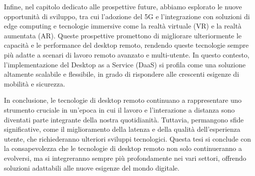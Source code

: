 \documentclass[12pt,a4paper,openright,twoside]{book}
\begin{document}
Infine, nel capitolo dedicato alle prospettive future, abbiamo esplorato le nuove opportunità di sviluppo, tra cui l'adozione del 5G e l'integrazione con soluzioni di edge computing e tecnologie immersive come la realtà virtuale (VR) e la realtà aumentata (AR). Queste prospettive promettono di migliorare ulteriormente le capacità e le performance del desktop remoto, rendendo queste tecnologie sempre più adatte a scenari di lavoro remoto avanzato e multi-utente. In questo contesto, l'implementazione del Desktop as a Service (DaaS) si profila come una soluzione altamente scalabile e flessibile, in grado di rispondere alle crescenti esigenze di mobilità e sicurezza.

In conclusione, le tecnologie di desktop remoto continuano a rappresentare uno strumento cruciale in un'epoca in cui il lavoro e l'interazione a distanza sono diventati parte integrante della nostra quotidianità. Tuttavia, permangono sfide significative, come il miglioramento della latenza e della qualità dell’esperienza utente, che richiederanno ulteriori sviluppi tecnologici. Questa tesi si conclude con la consapevolezza che le tecnologie di desktop remoto non solo continueranno a evolversi, ma si integreranno sempre più profondamente nei vari settori, offrendo soluzioni adattabili alle nuove esigenze del mondo digitale.



\backmatter

\nocite{*} %


    
\end{document}
